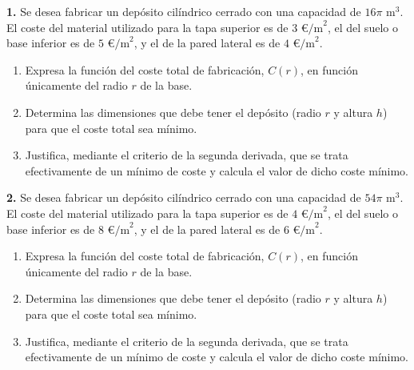 \documentclass[11pt,a4paper]{article}
\begin{document}
\pagestyle{empty}

\noindent\textbf{1.} Se desea fabricar un depósito cilíndrico cerrado con una capacidad de $16\pi\text{ m}^3$. El coste del material utilizado para la tapa superior es de $3\text{ €/m}^2$, el del suelo o base inferior es de $5\text{ €/m}^2$, y el de la pared lateral es de $4\text{ €/m}^2$.
\begin{enumerate}[label=\textbf{\alph*)}, leftmargin=2em, itemsep=6pt]
    \item Expresa la función del coste total de fabricación, $C(r)$, en función únicamente del radio $r$ de la base.
    \item Determina las dimensiones que debe tener el depósito (radio $r$ y altura $h$) para que el coste total sea mínimo.
    \item Justifica, mediante el criterio de la segunda derivada, que se trata efectivamente de un mínimo de coste y calcula el valor de dicho coste mínimo.
\end{enumerate}

\vspace{1cm}

\noindent\textbf{2.} Se desea fabricar un depósito cilíndrico cerrado con una capacidad de $54\pi\text{ m}^3$. El coste del material utilizado para la tapa superior es de $4\text{ €/m}^2$, el del suelo o base inferior es de $8\text{ €/m}^2$, y el de la pared lateral es de $6\text{ €/m}^2$.
\begin{enumerate}[label=\textbf{\alph*)}, leftmargin=2em, itemsep=6pt]
    \item Expresa la función del coste total de fabricación, $C(r)$, en función únicamente del radio $r$ de la base.
    \item Determina las dimensiones que debe tener el depósito (radio $r$ y altura $h$) para que el coste total sea mínimo.
    \item Justifica, mediante el criterio de la segunda derivada, que se trata efectivamente de un mínimo de coste y calcula el valor de dicho coste mínimo.
\end{enumerate}
\end{document}
